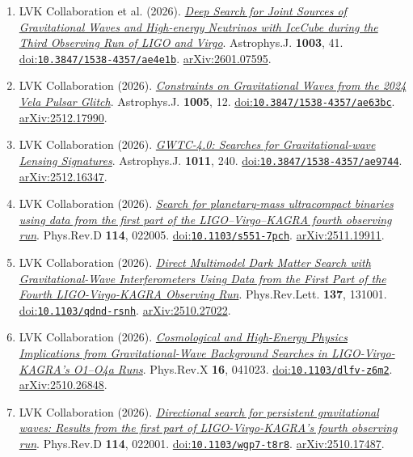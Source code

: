 \documentclass[11pt]{article}
\begin{document}
\begin{enumerate}
\item LVK Collaboration et al. (2026). \href{https://arxiv.org/abs/2601.07595}{\textit{Deep Search for Joint Sources of Gravitational Waves and High-energy Neutrinos with IceCube during the Third Observing Run of LIGO and Virgo}}. Astrophys.J. \textbf{1003}, 41. \href{https://doi.org/10.3847/1538-4357/ae4e1b}{doi:\nolinkurl{10.3847/1538-4357/ae4e1b}}. \href{https://arxiv.org/abs/2601.07595}{arXiv:2601.07595}.
\item LVK Collaboration (2026). \href{https://arxiv.org/abs/2512.17990}{\textit{Constraints on Gravitational Waves from the 2024 Vela Pulsar Glitch}}. Astrophys.J. \textbf{1005}, 12. \href{https://doi.org/10.3847/1538-4357/ae63bc}{doi:\nolinkurl{10.3847/1538-4357/ae63bc}}. \href{https://arxiv.org/abs/2512.17990}{arXiv:2512.17990}.
\item LVK Collaboration (2026). \href{https://arxiv.org/abs/2512.16347}{\textit{GWTC-4.0: Searches for Gravitational-wave Lensing Signatures}}. Astrophys.J. \textbf{1011}, 240. \href{https://doi.org/10.3847/1538-4357/ae9744}{doi:\nolinkurl{10.3847/1538-4357/ae9744}}. \href{https://arxiv.org/abs/2512.16347}{arXiv:2512.16347}.
\item LVK Collaboration (2026). \href{https://arxiv.org/abs/2511.19911}{\textit{Search for planetary-mass ultracompact binaries using data from the first part of the LIGO--Virgo--KAGRA fourth observing run}}. Phys.Rev.D \textbf{114}, 022005. \href{https://doi.org/10.1103/s551-7pch}{doi:\nolinkurl{10.1103/s551-7pch}}. \href{https://arxiv.org/abs/2511.19911}{arXiv:2511.19911}.
\item LVK Collaboration (2026). \href{https://arxiv.org/abs/2510.27022}{\textit{Direct Multimodel Dark Matter Search with Gravitational-Wave Interferometers Using Data from the First Part of the Fourth LIGO-Virgo-KAGRA Observing Run}}. Phys.Rev.Lett. \textbf{137}, 131001. \href{https://doi.org/10.1103/qdnd-rsnh}{doi:\nolinkurl{10.1103/qdnd-rsnh}}. \href{https://arxiv.org/abs/2510.27022}{arXiv:2510.27022}.
\item LVK Collaboration (2026). \href{https://arxiv.org/abs/2510.26848}{\textit{Cosmological and High-Energy Physics Implications from Gravitational-Wave Background Searches in LIGO-Virgo-KAGRA's O1--O4a Runs}}. Phys.Rev.X \textbf{16}, 041023. \href{https://doi.org/10.1103/dlfv-z6m2}{doi:\nolinkurl{10.1103/dlfv-z6m2}}. \href{https://arxiv.org/abs/2510.26848}{arXiv:2510.26848}.
\item LVK Collaboration (2026). \href{https://arxiv.org/abs/2510.17487}{\textit{Directional search for persistent gravitational waves: Results from the first part of LIGO-Virgo-KAGRA's fourth observing run}}. Phys.Rev.D \textbf{114}, 022001. \href{https://doi.org/10.1103/wgp7-t8r8}{doi:\nolinkurl{10.1103/wgp7-t8r8}}. \href{https://arxiv.org/abs/2510.17487}{arXiv:2510.17487}.

\end{enumerate}
\end{document}
